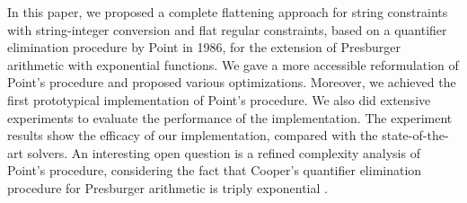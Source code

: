 
In this paper, we proposed a complete flattening approach for string constraints with string-integer conversion and flat regular constraints, based on a quantifier elimination procedure by Point in 1986, for the extension of Presburger arithmetic with exponential functions. We gave a more accessible reformulation of Point's procedure and proposed various optimizations. Moreover, we achieved the first prototypical implementation of Point's procedure. We also did extensive experiments to evaluate the performance of the implementation. The experiment results show the efficacy of our implementation, compared with the state-of-the-art solvers. An interesting open question is a refined complexity analysis of Point's procedure, considering the fact that Cooper's quantifier elimination procedure for Presburger arithmetic is triply exponential \cite{Oppen73}. 
